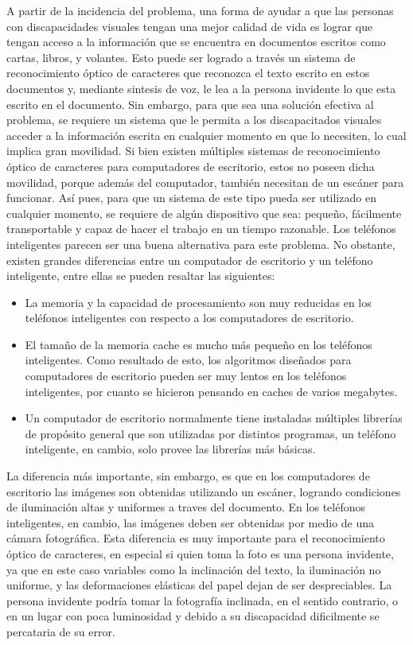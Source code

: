 \documentclass[a4paper, 11pt, oneside]{report}
\begin{document}
A partir de la incidencia del problema, una forma de ayudar a que las personas con discapacidades visuales tengan una mejor calidad de vida es lograr que tengan acceso a la información que se encuentra en documentos escritos como cartas, libros, y volantes. Esto puede ser logrado a través un sistema de reconocimiento óptico de caracteres que reconozca el texto escrito en estos documentos y, mediante sintesis de voz, le lea a la persona invidente lo que esta escrito en el documento. Sin embargo, para que sea una solución efectiva al problema, se requiere un sistema que le permita a los discapacitados visuales acceder a la información escrita en cualquier momento en que lo necesiten, lo cual implica gran movilidad. Si bien existen múltiples sistemas de reconocimiento óptico de caracteres para computadores de escritorio, estos no poseen dicha movilidad, porque además del computador, también necesitan de un escáner para funcionar. Así pues, para que un sistema de este tipo pueda ser utilizado en cualquier momento, se requiere de algún dispositivo que sea: pequeño, fácilmente transportable y capaz de hacer el trabajo en un tiempo razonable. Los teléfonos inteligentes parecen ser una buena alternativa para este problema. No obstante, existen grandes diferencias entre un computador de escritorio y un teléfono inteligente, entre ellas se pueden resaltar las siguientes:

	\begin{itemize}

	\item La memoria y la capacidad de procesamiento son muy reducidas en los teléfonos inteligentes con respecto a los computadores de escritorio.

	\item El tamaño de la memoria cache es mucho más pequeño en los teléfonos inteligentes. Como resultado de esto, los algoritmos diseñados para computadores de escritorio pueden ser muy lentos en los teléfonos inteligentes, por cuanto se hicieron pensando en caches de varios megabytes.

	\item Un computador de escritorio normalmente tiene instaladas múltiples librerías de propósito general que son utilizadas por distintos programas, un teléfono inteligente, en cambio, solo provee las librerías más básicas.

	\end{itemize}

La diferencia más importante, sin embargo, es que en los computadores de escritorio las imágenes son obtenidas utilizando un escáner, logrando condiciones de iluminación altas y uniformes a traves del documento. En los teléfonos inteligentes, en cambio, las imágenes deben ser obtenidas por medio de una cámara fotográfica. Esta diferencia es muy importante para el reconocimiento óptico de caracteres, en especial si quien toma la foto es una persona invidente, ya que en este caso variables como la inclinación del texto, la iluminación no uniforme, y las deformaciones elásticas del papel dejan de ser despreciables. La persona invidente podría tomar la fotografía inclinada, en el sentido contrario, o en un lugar con poca luminosidad y debido a su discapacidad dificilmente se percataria de su error.
\end{document}
